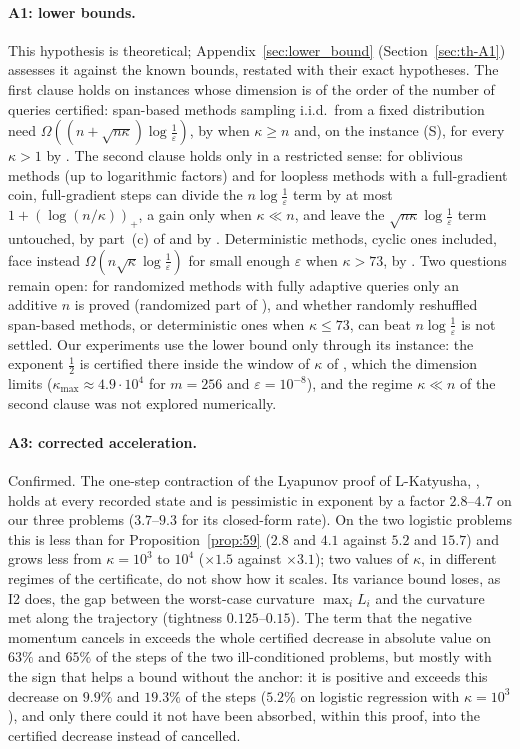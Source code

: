 \paragraph{A1: lower bounds.}
This hypothesis is theoretical; Appendix~\ref{sec:lower_bound} (Section~\ref{sec:th-A1}) assesses it against the known
bounds, restated with their exact hypotheses. The first clause holds on instances whose dimension is of the order of
the number of queries certified: span-based methods sampling i.i.d.\ from a fixed distribution need
$\Omega((n+\sqrt{n\kappa})\log\frac1\varepsilon)$, by  when $\kappa\ge n$ and, on the instance (S), for
every $\kappa>1$ by . The second clause holds only in a restricted sense: for oblivious methods (up
to logarithmic factors) and for loopless methods with a full-gradient coin, full-gradient steps can divide the $n\log\frac1\varepsilon$ term by at most $1+(\log(n/\kappa))_+$, a gain only
when $\kappa\ll n$, and leave the $\sqrt{n\kappa}\log\frac1\varepsilon$ term untouched, by part~(c) of
 and by . Deterministic methods, cyclic ones included, face instead
$\Omega(n\sqrt\kappa\log\frac1\varepsilon)$ for small enough $\varepsilon$ when $\kappa>73$, by . Two
questions remain open: for randomized methods with fully adaptive queries only an additive $n$ is proved (randomized
part of ), and whether randomly reshuffled span-based methods, or deterministic ones when $\kappa\le73$,
can beat $n\log\frac1\varepsilon$ is not settled. Our experiments use the lower bound only through its instance: the
exponent $\frac12$ is certified there inside the window of $\kappa$ of , which the dimension limits
($\kappa_{\max}\approx4.9\cdot10^4$ for $m=256$ and $\varepsilon=10^{-8}$), and the regime $\kappa\ll n$ of the second
clause was not explored numerically.

\paragraph{A3: corrected acceleration.}
Confirmed. The one-step contraction of the Lyapunov proof of L-Katyusha, , holds at every recorded
state and is pessimistic in exponent by a factor $2.8$--$4.7$ on our three problems ($3.7$--$9.3$ for its closed-form
rate). On the two logistic problems this is less than for Proposition~\ref{prop:59} ($2.8$ and $4.1$ against $5.2$ and
$15.7$) and grows less from $\kappa=10^3$ to $10^4$ ($\times1.5$ against $\times3.1$); two values of $\kappa$, in
different regimes of the certificate, do not show how it scales. Its variance bound loses, as I2 does, the gap between
the worst-case curvature $\max_iL_i$ and the curvature met along the trajectory (tightness $0.125$--$0.15$). The term
that the negative momentum cancels in  exceeds the whole certified decrease in absolute value on
$63\%$ and $65\%$ of the steps of the two ill-conditioned problems, but mostly with the sign that helps a bound without
the anchor: it is positive and exceeds this decrease on $9.9\%$ and $19.3\%$ of the steps ($5.2\%$ on logistic
regression with $\kappa=10^3$), and only there could it not have been absorbed, within this proof, into the certified
decrease instead of cancelled.

